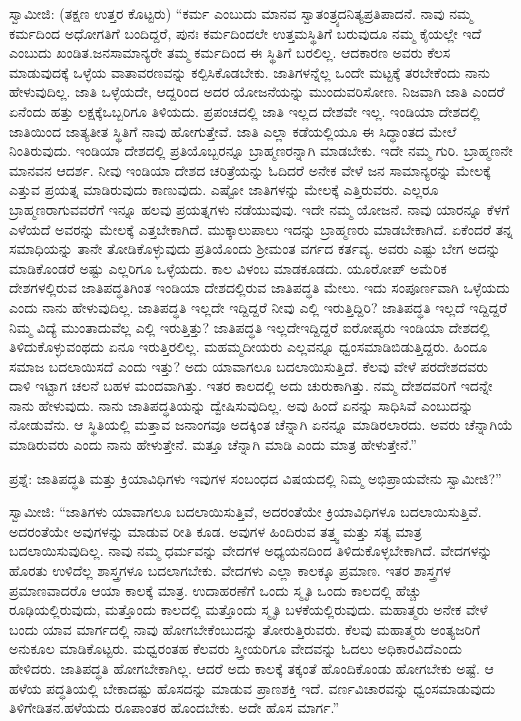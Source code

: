 ಸ್ವಾಮೀಜಿ: (ತಕ್ಷಣ ಉತ್ತರ ಕೊಟ್ಟರು) “ಕರ್ಮ ಎಂಬುದು ಮಾನವ ಸ್ವಾತಂತ್ರ್ಯದ\break ನಿತ್ಯಪ್ರತಿಪಾದನೆ. ನಾವು ನಮ್ಮ ಕರ್ಮದಿಂದ ಅಧೋಗತಿಗೆ ಬಂದಿದ್ದರೆ, ಪುನಃ ಕರ್ಮದಿಂದಲೇ ಉತ್ತಮಸ್ಥಿತಿಗೆ ಬರುವುದೂ ನಮ್ಮ ಕೈಯಲ್ಲೇ ಇದೆ ಎಂಬುದು ಖಂಡಿತ.\break ಜನಸಾಮಾನ್ಯರೇ ತಮ್ಮ ಕರ್ಮದಿಂದ ಈ ಸ್ಥಿತಿಗೆ ಬರಲಿಲ್ಲ. ಆದಕಾರಣ ಅವರು ಕೆಲಸ ಮಾಡುವುದಕ್ಕೆ ಒಳ್ಳೆಯ ವಾತಾವರಣವನ್ನು ಕಲ್ಪಿಸಿಕೊಡಬೇಕು. ಜಾತಿಗಳನ್ನೆಲ್ಲ ಒಂದೇ ಮಟ್ಟಕ್ಕೆ ತರಬೇಕೆಂದು ನಾನು ಹೇಳುವುದಿಲ್ಲ. ಜಾತಿ ಒಳ್ಳೆಯದೇ, ಆದ್ದರಿಂದ ಅದರ ಯೋಜನೆಯನ್ನು ಮುಂದುವರಿಸೋಣ. ನಿಜವಾಗಿ ಜಾತಿ ಎಂದರೆ ಏನೆಂದು ಹತ್ತು ಲಕ್ಷಕ್ಕೆ\break ಒಬ್ಬರಿಗೂ ತಿಳಿಯದು. ಪ್ರಪಂಚದಲ್ಲಿ ಜಾತಿ ಇಲ್ಲದ ದೇಶವೇ ಇಲ್ಲ. ಇಂಡಿಯಾ ದೇಶದಲ್ಲಿ ಜಾತಿಯಿಂದ ಜಾತ್ಯತೀತ ಸ್ಥಿತಿಗೆ ನಾವು ಹೋಗುತ್ತೇವೆ. ಜಾತಿ ಎಲ್ಲಾ ಕಡೆಯಲ್ಲಿಯೂ ಈ ಸಿದ್ಧಾಂತದ ಮೇಲೆ ನಿಂತಿರುವುದು. ಇಂಡಿಯಾ ದೇಶದಲ್ಲಿ ಪ್ರತಿಯೊಬ್ಬರನ್ನೂ ಬ್ರಾಹ್ಮಣ\-ರನ್ನಾಗಿ ಮಾಡಬೇಕು. ಇದೇ ನಮ್ಮ ಗುರಿ. ಬ್ರಾಹ್ಮಣನೇ ಮಾನವನ ಆದರ್ಶ. ನೀವು ಇಂಡಿಯಾ ದೇಶದ ಚರಿತ್ರೆಯನ್ನು ಓದಿದರೆ ಅನೇಕ ವೇಳೆ ಜನ ಸಾಮಾನ್ಯರನ್ನು ಮೇಲಕ್ಕೆ ಎತ್ತುವ ಪ್ರಯತ್ನ ಮಾಡಿರುವುದು ಕಾಣುವುದು. ಎಷ್ಟೋ ಜಾತಿಗಳನ್ನು ಮೇಲಕ್ಕೆ ಎತ್ತಿರುವರು. ಎಲ್ಲರೂ ಬ್ರಾಹ್ಮಣರಾಗುವವರೆಗೆ ಇನ್ನೂ ಹಲವು ಪ್ರಯತ್ನಗಳು ನಡೆಯುವುವು. ಇದೇ ನಮ್ಮ ಯೋಜನೆ. ನಾವು ಯಾರನ್ನೂ ಕೆಳಗೆ ಎಳೆಯದೆ ಅವರನ್ನು ಮೇಲಕ್ಕೆ ಎತ್ತಬೇಕಾಗಿದೆ. ಮುಕ್ಕಾಲುಪಾಲು ಇದನ್ನು ಬ್ರಾಹ್ಮಣರು ಮಾಡಬೇಕಾಗಿದೆ. ಏಕೆಂದರೆ ತನ್ನ ಸಮಾಧಿಯನ್ನು ತಾನೇ ತೋಡಿಕೊಳ್ಳುವುದು ಪ್ರತಿಯೊಂದು ಶ‍್ರೀಮಂತ ವರ್ಗದ ಕರ್ತವ್ಯ. ಅವರು ಎಷ್ಟು ಬೇಗ ಅದನ್ನು ಮಾಡಿಕೊಂಡರೆ ಅಷ್ಟು ಎಲ್ಲರಿಗೂ ಒಳ್ಳೆಯದು. ಕಾಲ ವಿಳಂಬ ಮಾಡಕೂಡದು. ಯೂರೋಪ್​ ಅಮೆರಿಕ ದೇಶಗಳಲ್ಲಿರುವ ಜಾತಿಪದ್ಧತಿಗಿಂತ ಇಂಡಿಯಾ ದೇಶದಲ್ಲಿರುವ ಜಾತಿಪದ್ಧತಿ ಮೇಲು. ಇದು ಸಂಪೂರ್ಣವಾಗಿ ಒಳ್ಳೆಯದು ಎಂದು ನಾನು ಹೇಳುವುದಿಲ್ಲ. ಜಾತಿಪದ್ಧತಿ ಇಲ್ಲದೇ ಇದ್ದಿದ್ದರೆ ನೀವು ಎಲ್ಲಿ ಇರುತ್ತಿದ್ದಿರಿ? ಜಾತಿಪದ್ಧತಿ ಇಲ್ಲದೆ ಇದ್ದಿದ್ದರೆ ನಿಮ್ಮ ವಿದ್ಯೆ ಮುಂತಾದುವೆಲ್ಲ ಎಲ್ಲಿ ಇರುತ್ತಿತ್ತು? ಜಾತಿಪದ್ಧತಿ ಇಲ್ಲದೇ\break ಇದ್ದಿದ್ದರೆ ಐರೋಪ್ಯರು ಇಂಡಿಯಾ ದೇಶದಲ್ಲಿ ತಿಳಿದುಕೊಳ್ಳುವಂಥದು ಏನೂ ಇರುತ್ತಿರಲಿಲ್ಲ. ಮಹಮ್ಮದೀಯರು ಎಲ್ಲವನ್ನೂ ಧ್ವಂಸಮಾಡಿಬಿಡುತ್ತಿದ್ದರು. ಹಿಂದೂ ಸಮಾಜ ಬದಲಾಯಿಸದೆ ಎಂದು ಇತ್ತು? ಅದು ಯಾವಾಗಲೂ ಬದಲಾಯಿಸುತ್ತಿದೆ. ಕೆಲವು ವೇಳೆ ಪರದೇಶದವರು ದಾಳಿ ಇಟ್ಟಾಗ ಚಲನೆ ಬಹಳ ಮಂದವಾಗಿತ್ತು. ಇತರ ಕಾಲದಲ್ಲಿ ಅದು ಚುರುಕಾಗಿತ್ತು. ನಮ್ಮ ದೇಶದವರಿಗೆ ಇದನ್ನೇ ನಾನು ಹೇಳುವುದು. ನಾನು ಜಾತಿಪದ್ಧತಿಯನ್ನು ದ್ವೇಷಿಸುವುದಿಲ್ಲ. ಅವು ಹಿಂದೆ ಏನನ್ನು ಸಾಧಿಸಿವೆ ಎಂಬುದನ್ನು ನೋಡುವೆನು. ಆ ಸ್ಥಿತಿಯಲ್ಲಿ ಮತ್ತಾವ ಜನಾಂಗವೂ ಅದಕ್ಕಿಂತ ಚೆನ್ನಾಗಿ ಏನನ್ನೂ ಮಾಡಿರಲಾರದು. ಅವರು ಚೆನ್ನಾಗಿಯೆ ಮಾಡಿರುವರು ಎಂದು ನಾನು ಹೇಳುತ್ತೇನೆ. ಮತ್ತೂ ಚೆನ್ನಾಗಿ ಮಾಡಿ ಎಂದು ಮಾತ್ರ ಹೇಳುತ್ತೇನೆ.”

\vskip 4pt

ಪ್ರಶ್ನೆ: ಜಾತಿಪದ್ಧತಿ ಮತ್ತು ಕ್ರಿಯಾವಿಧಿಗಳು ಇವುಗಳ ಸಂಬಂಧದ ವಿಷಯದಲ್ಲಿ ನಿಮ್ಮ ಅಭಿಪ್ರಾಯವೇನು ಸ್ವಾಮೀಜಿ?”

\vskip 4pt

ಸ್ವಾಮೀಜಿ: “ಜಾತಿಗಳು ಯಾವಾಗಲೂ ಬದಲಾಯಿಸುತ್ತಿವೆ, ಅದರಂತೆಯೇ ಕ್ರಿಯಾವಿಧಿಗಳೂ ಬದಲಾಯಿಸುತ್ತಿವೆ. ಅದರಂತೆಯೇ ಅವುಗಳನ್ನು ಮಾಡುವ ರೀತಿ ಕೂಡ. ಅವುಗಳ ಹಿಂದಿರುವ ತತ್ತ್ವ ಮತ್ತು ಸತ್ಯ ಮಾತ್ರ ಬದಲಾಯಿಸುವುದಿಲ್ಲ. ನಾವು ನಮ್ಮ ಧರ್ಮವನ್ನು ವೇದಗಳ ಅಧ್ಯಯನದಿಂದ ತಿಳಿದುಕೊಳ್ಳಬೇಕಾಗಿದೆ. ವೇದಗಳನ್ನು ಹೊರತು ಉಳಿದೆಲ್ಲ ಶಾಸ್ತ್ರಗಳೂ ಬದಲಾಗಬೇಕು. ವೇದಗಳು ಎಲ್ಲಾ ಕಾಲಕ್ಕೂ ಪ್ರಮಾಣ. ಇತರ ಶಾಸ್ತ್ರಗಳ ಪ್ರಮಾಣವಾದರೊ ಆಯಾ ಕಾಲಕ್ಕೆ ಮಾತ್ರ. ಉದಾಹರಣೆಗೆ ಒಂದು ಸ್ಮೃತಿ ಒಂದು ಕಾಲದಲ್ಲಿ ಹೆಚ್ಚು ರೂಢಿಯಲ್ಲಿರುವುದು, ಮತ್ತೊಂದು ಕಾಲದಲ್ಲಿ ಮತ್ತೊಂದು ಸ್ಮೃತಿ ಬಳಕೆಯಲ್ಲಿರುವುದು. ಮಹಾತ್ಮರು ಅನೇಕ ವೇಳೆ ಬಂದು ಯಾವ ಮಾರ್ಗದಲ್ಲಿ ನಾವು ಹೋಗಬೇಕೆಂಬುದನ್ನು ತೋರುತ್ತಿರುವರು. ಕೆಲವು ಮಹಾತ್ಮರು ಅಂತ್ಯಜರಿಗೆ ಅನುಕೂಲ ಮಾಡಿಕೊಟ್ಟರು. ಮಧ್ವರಂತಹ ಕೆಲವರು ಸ್ತ್ರೀಯರಿಗೂ ವೇದವನ್ನು ಓದಲು ಅಧಿಕಾರವಿದೆ\break ಎಂದು ಹೇಳಿದರು. ಜಾತಿಪದ್ಧತಿ ಹೋಗಬೇಕಾಗಿಲ್ಲ. ಆದರೆ ಅದು ಕಾಲಕ್ಕೆ ತಕ್ಕಂತೆ ಹೊಂದಿಕೊಂಡು ಹೋಗಬೇಕು ಅಷ್ಟೆ. ಆ ಹಳೆಯ ಪದ್ಧತಿಯಲ್ಲಿ ಬೇಕಾದಷ್ಟು ಹೊಸದನ್ನು ಮಾಡುವ ಪ್ರಾಣಶಕ್ತಿ ಇದೆ. ವರ್ಣವಿಚಾರವನ್ನು ಧ್ವಂಸಮಾಡುವುದು ತಿಳಿಗೇಡಿತನ.\break ಹಳೆಯದು ರೂಪಾಂತರ ಹೊಂದಬೇಕು. ಅದೇ ಹೊಸ ಮಾರ್ಗ.”

